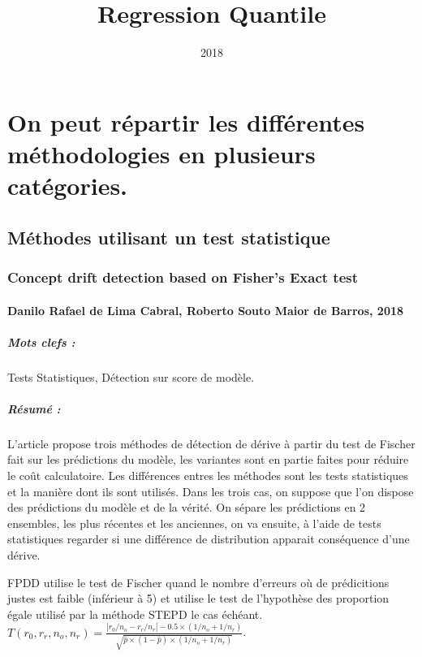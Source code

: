 \documentclass[11pt,a4paper]{report}
\title{Regression Quantile}
\date{2018}
\begin{document}
\tableofcontents

\chapter{On peut répartir les différentes méthodologies en plusieurs catégories.}
\section{Méthodes utilisant un test statistique}



\subsection{Concept drift detection based on Fisher’s Exact test}
\subsubsection{Danilo Rafael de Lima Cabral, Roberto Souto Maior de Barros, 2018}

\paragraph{Mots clefs :} Tests Statistiques, Détection sur score de modèle.

\paragraph{Résumé :}
L'article propose trois méthodes de détection de dérive à partir du test de Fischer fait sur les prédictions du modèle, les variantes sont en partie faites pour réduire le coût calculatoire. Les différences entres les méthodes sont les tests statistiques et la manière dont ils sont utilisés. Dans les trois cas, on suppose que l'on dispose des prédictions du modèle et de la vérité. On sépare les prédictions en 2 ensembles, les plus récentes et les anciennes, on va ensuite, à l'aide de tests statistiques regarder si une différence de distribution apparait conséquence d'une dérive. 

FPDD utilise le test de Fischer quand le nombre d'erreurs où de prédicitions justes est faible (inférieur à 5) et utilise le test de l'hypothèse des proportion égale utilisé par la méthode STEPD le cas échéant. $T\left(r_{0}, r_{r}, n_{o}, n_{r}\right)=\frac{\left|r_{0} / n_{o}-r_{r} / n_{r}\right|-0.5 \times\left(1 / n_{o}+1 / n_{r}\right)}{\sqrt{\hat{p} \times(1-\hat{p}) \times\left(1 / n_{o}+1 / n_{r}\right)}}$.
\end{document}
